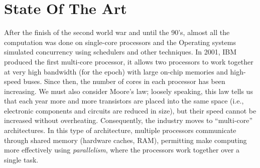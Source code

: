 \chapter{\label{chapter:2_state_of_art}State Of The Art}

After the finish of the second world war and until the 90's, almost
all the computation was done on single-core processors and the
Operating systems simulated concurrency using schedulers and other
techniques. In 2001, IBM produced the first multi-core
processor\cite{ibmIBM100Power}, it allows two processors to work
together at very high bandwidth (for the epoch) with large on-chip
memories and high-speed buses. Since then, the number of cores in each
processor has been increasing. We must also consider Moore's law;
loosely speaking, this law tells us that each year more and more
transistors are placed into the same space (i.e., electronic
components and circuits are reduced in size), but their speed cannot
be increased without overheating. Consequently, the industry moves to
``multi-core'' architectures. In this type of architecture, multiple
processors communicate through shared memory (hardware caches, RAM),
permitting make computing more effectively using \textit{parallelism},
where the processors work together over a single
task\cite{DBLP_books_daglib_0020056}.



